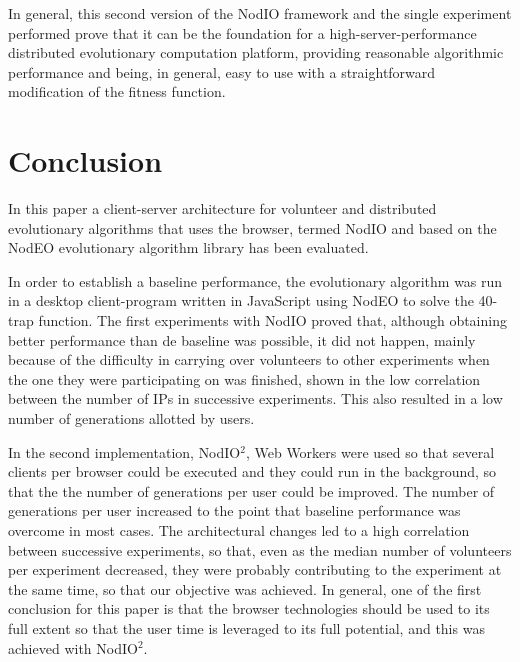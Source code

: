 \documentclass[journal,onecolumn]{IEEEtran}
\begin{document}
In general, this second version of the {\sf NodIO} framework and the
single experiment performed prove that it can be the foundation for a
high-server-performance distributed evolutionary computation platform,
providing reasonable algorithmic performance and being, in general,
easy to use with a straightforward modification of the fitness
function. 

\section{Conclusion}
\label{sec:conclusion}

In this paper a client-server architecture for volunteer and distributed
evolutionary algorithms that uses the browser, termed {\sf NodIO} and
based on the {\sf NodEO} evolutionary algorithm library has been evaluated. 

In order to establish a baseline performance, the evolutionary
algorithm was run in a desktop client-program written in JavaScript
using NodEO to solve the 40-trap function. The first experiments with
{\sf NodIO} proved that, although obtaining better performance than de
baseline was possible, it did not happen, mainly because of the
difficulty in carrying over volunteers to other experiments when the
one they were participating on was finished, shown in the low
correlation between the number of IPs in successive experiments. This
also resulted in a low number of generations allotted by users. 

In the second implementation, {\sf NodIO$^2$}, Web Workers
were used so that several clients per browser could be executed and
they could run in the background, so that the the number of
generations per user could be improved. The number of generations per
user increased to the point that baseline performance was overcome in
most cases. The architectural changes led to a high correlation
between successive experiments, so that, even as the median number of
volunteers per experiment decreased, they were probably contributing
to the experiment at the same time, so that our objective was
achieved. In general, one of the first conclusion for this paper is
that the browser technologies should be used to its full extent so
that the user time is leveraged to its full potential, and this was
achieved with {\sf NodIO$^2$}.
\end{document}
